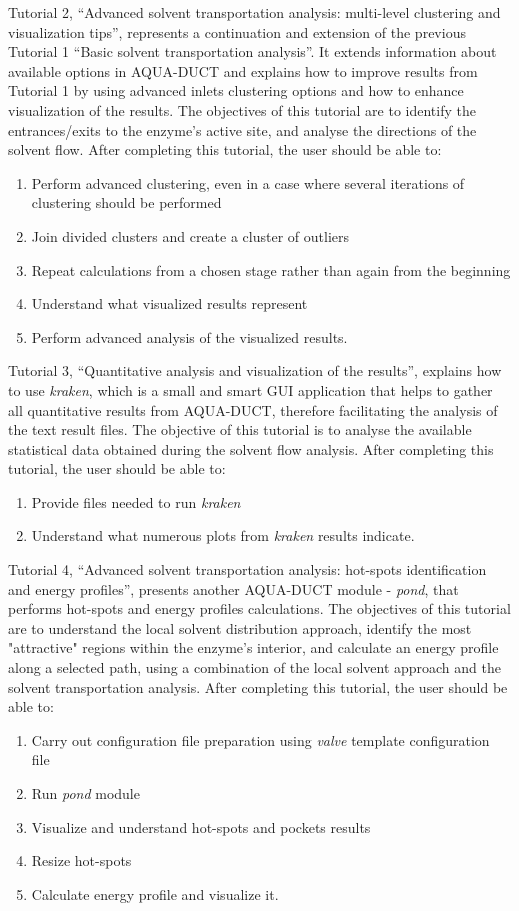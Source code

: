 \documentclass[9pt,tutorial, pubversion]{livecoms}
\begin{document}
Tutorial 2, “Advanced solvent transportation analysis: multi-level clustering and visualization tips”, represents a continuation and extension of the previous Tutorial 1 “Basic solvent transportation analysis”. It extends information about available options in AQUA-DUCT and explains how to improve results from Tutorial 1 by using advanced inlets clustering options and how to enhance visualization of the results. The objectives of this tutorial are to identify the entrances/exits to the enzyme's active site, and analyse the directions of the solvent flow. After completing this tutorial, the user should be able to:
\begin{enumerate}
  \item Perform advanced clustering, even in a case where several iterations of clustering should be performed
  \item Join divided clusters and create a cluster of outliers
  \item Repeat calculations from a chosen stage rather than again from the beginning
  \item Understand what visualized results represent
  \item Perform advanced analysis of the visualized results.
\end{enumerate}

Tutorial 3, “Quantitative analysis and visualization of the results”, explains how to use \textit{kraken}, which is a small and smart GUI application that helps to gather all quantitative results from AQUA-DUCT, therefore facilitating the analysis of the text result files. The objective of this tutorial is to analyse the available statistical data obtained during the solvent flow analysis. After completing this tutorial, the user should be able to:
\begin{enumerate}
  \item Provide files needed to run \textit{kraken}
  \item Understand what numerous plots from \textit{kraken} results indicate.
\end{enumerate}

Tutorial 4, “Advanced solvent transportation analysis: hot-spots identification and energy profiles”, presents another AQUA-DUCT module - \textit{pond}, that performs hot-spots and energy profiles calculations. The objectives of this tutorial are to understand the local solvent distribution approach, identify the most "attractive" regions within the enzyme's interior, and calculate an energy profile along a selected path, using a combination of the local solvent approach and the solvent transportation analysis. After completing this tutorial, the user should be able to:
\begin{enumerate}
  \item Carry out configuration file preparation using \textit{valve} template configuration file
  \item Run \textit{pond} module
  \item Visualize and understand hot-spots and pockets results
  \item Resize hot-spots
  \item Calculate energy profile and visualize it.
\end{enumerate}
\end{document}
